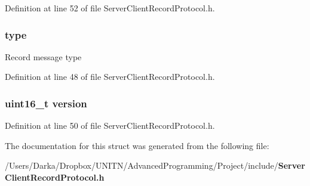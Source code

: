 Definition at line 52 of file Server\+Client\+Record\+Protocol.\+h.

\subsubsection[{type}]{ type}\label{structrecord__t_a01b4086b16c52f17cfc0d8b97c34fb85}
Record message type 

Definition at line 48 of file Server\+Client\+Record\+Protocol.\+h.

\subsubsection[{version}]{\setlength{\rightskip}{0pt plus 5cm}uint16\+\_\+t version}\label{structrecord__t_ab6d7b6f8c2ceaba7acda80aaf05f4899}


Definition at line 50 of file Server\+Client\+Record\+Protocol.\+h.



The documentation for this struct was generated from the following file\+:\begin{DoxyCompactItemize}
\item 
/\+Users/\+Darka/\+Dropbox/\+U\+N\+I\+T\+N/\+Advanced\+Programming/\+Project/include/{\bf Server\+Client\+Record\+Protocol.\+h}\end{DoxyCompactItemize}
